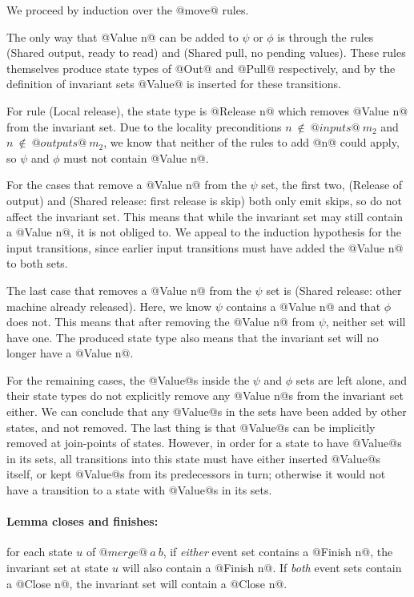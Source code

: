 We proceed by induction over the @move@ rules.

The only way that @Value n@ can be added to $\psi$ or $\phi$ is through the rules (Shared output, ready to read) and (Shared pull, no pending values).
These rules themselves produce state types of @Out@ and @Pull@ respectively, and by the definition of invariant sets @Value@ is inserted for these transitions.

For rule (Local release), the state type is @Release n@ which removes @Value n@ from the invariant set.
Due to the locality preconditions $n~\not\in~@inputs@~m_2$ and $n~\not\in~@outputs@~m_2$, we know that neither of the rules to add @n@ could apply, so $\psi$ and $\phi$ must not contain @Value n@.

For the cases that remove a @Value n@ from the $\psi$ set, the first two, (Release of output) and (Shared release: first release is skip) both only emit skips, so do not affect the invariant set.
This means that while the invariant set may still contain a @Value n@, it is not obliged to.
We appeal to the induction hypothesis for the input transitions, since earlier input transitions must have added the @Value n@ to both sets.

The last case that removes a @Value n@ from the $\psi$ set is (Shared release: other machine already released).
Here, we know $\psi$ contains a @Value n@ and that $\phi$ does not.
This means that after removing the @Value n@ from $\psi$, neither set will have one.
The produced state type also means that the invariant set will no longer have a @Value n@.

For the remaining cases, the @Value@s inside the $\psi$ and $\phi$ sets are left alone, and their state types do not explicitly remove any @Value n@s from the invariant set either.
We can conclude that any @Value@s in the sets have been added by other states, and not removed.
The last thing is that @Value@s can be implicitly removed at join-points of states.
However, in order for a state to have @Value@s in its sets, all transitions into this state must have either inserted @Value@s itself, or kept @Value@s from its predecessors in turn; otherwise it would not have a transition to a state with @Value@s in its sets.

\paragraph{Lemma closes and finishes:} 
for each state $u$ of $@merge@~a~b$, if \emph{either} event set contains a @Finish n@, the invariant set at state $u$ will also contain a @Finish n@.
If \emph{both} event sets contain a @Close n@, the invariant set will contain a @Close n@.

